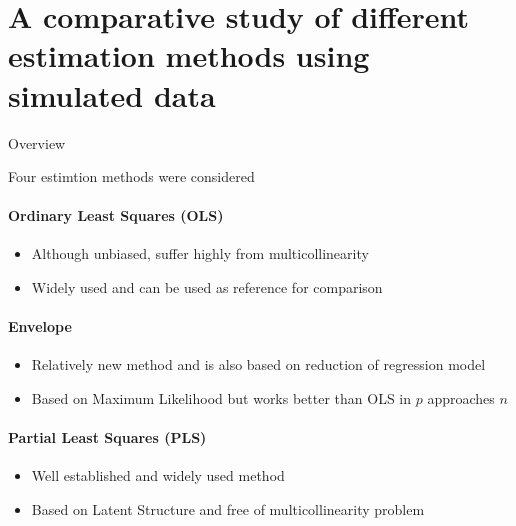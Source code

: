 \documentclass[ignorenonframetext,]{beamer}
\providecommand{\tightlist}{%
\setlength{\itemsep}{0pt}\setlength{\parskip}{0pt}}
\begin{document}
\section{A comparative study of different estimation methods using
simulated
data}\label{a-comparative-study-of-different-estimation-methods-using-simulated-data}

\begin{frame}{Overview}

\begin{block}{Four estimtion methods were considered}

\hypertarget{left}{}
\paragraph{Ordinary Least Squares
(OLS)}\label{ordinary-least-squares-ols}

\begin{itemize}
\tightlist
\item
  Although unbiased, suffer highly from multicollinearity
\item
  Widely used and can be used as reference for comparison
\end{itemize}

\paragraph{Envelope}\label{envelope}

\begin{itemize}
\tightlist
\item
  Relatively new method \citep{cook2013envelopes} and is also based on
  reduction of regression model
\item
  Based on Maximum Likelihood but works better than OLS in \(p\)
  approaches \(n\)
\end{itemize}

\hypertarget{right}{}
\paragraph{Partial Least Squares (PLS)}\label{partial-least-squares-pls}

\begin{itemize}
\tightlist
\item
  Well established and widely used method
\item
  Based on Latent Structure and free of multicollinearity problem
\end{itemize}


\end{block}
\end{frame}
\end{document}
